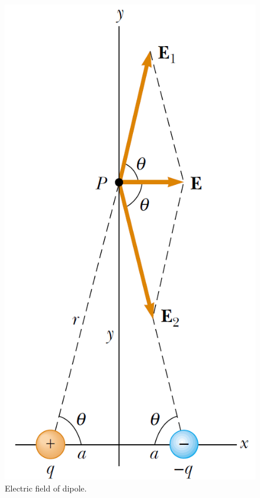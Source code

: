 \documentclass[12pt,a4paper]{article}
\begin{document}
\begin{figure}[H]
\centering
\includegraphics[scale=0.45]{Figure23-15.png}
\caption{Electric field of dipole.}
\label{electric-field-dipole}
\end{figure}


\end{document}
